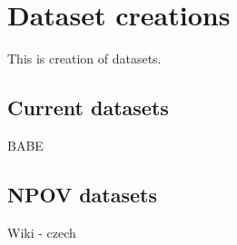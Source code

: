 \chapter{Dataset creations}
This is creation of datasets.

\section{Current datasets}
BABE
\section{NPOV datasets}
Wiki - czech